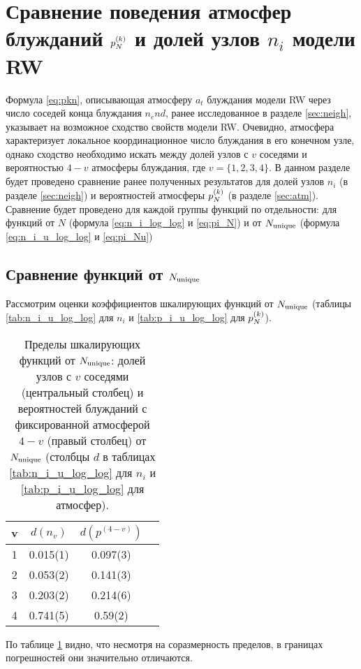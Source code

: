 \section{Сравнение поведения атмосфер блужданий $p^{(k)}_N$ и долей узлов $n_i$ модели RW}

Формула \eqref{eq:pkn}, описывающая атмосферу $a_t$ блуждания модели RW через число соседей конца блуждания $n_end$, ранее исследованное в разделе \ref{sec:neigh}, указывает на возможное сходство свойств модели RW.
Очевидно, атмосфера характеризует локальное координационное число блуждания в его конечном узле, однако сходство необходимо искать между долей узлов с $v$ соседями и вероятностью $4-v$ атмосферы блуждания, где $v=\{1,2,3,4\}$.
В данном разделе будет проведено сравнение ранее полученных результатов для долей узлов $n_i$ (в разделе \ref{sec:neigh}) и вероятностей атмосферы $p^{(k)}_N$ (в разделе \ref{sec:atm}). 
Сравнение будет проведено для каждой группы функций по отдельности: для функций от $N$ (формула \eqref{eq:n_i_log_log} и \eqref{eq:pi_N}) и от $N_{\textup{unique}}$ (формула \eqref{eq:n_i_u_log_log} и \eqref{eq:pi_Nu})

\subsection{Сравнение функций от $N_{\textup{unique}}$}

Рассмотрим оценки коэффициентов шкалирующих функций от $N_{\textup{unique}}$ (таблицы \ref{tab:n_i_u_log_log} для $n_i$ и \ref{tab:p_i_u_log_log} для $p^{(k)}_N$).

\begin{table}[h]
\centering
\begin{tabular}{|c|c|c|c|}
\hline
v & $d(n_v)$ & $d(p^{(4-v)})$ \\ \hline
1 & 0.015(1) & 0.097(3) \\ \hline
2 & 0.053(2) & 0.141(3) \\ \hline
3 & 0.203(2) & 0.214(6) \\ \hline
4 & 0.741(5) & 0.59(2) \\ \hline
\end{tabular}
\caption{Пределы шкалирующих функций от $N_{\textup{unique}}$: долей узлов с $v$ соседями (центральный столбец) и вероятностей блужданий с фиксированной атмосферой $4-v$ (правый столбец) от $N_{\textup{unique}}$ (столбцы $d$ в таблицах \ref{tab:n_i_u_log_log} для $n_i$ и \ref{tab:p_i_u_log_log} для атмосфер).}
\label{tab:n_vs_atm_d}
\end{table}

По таблице \ref{tab:n_vs_atm_d} видно, что несмотря на соразмерность пределов, в границах погрешностей они значительно отличаются.  

